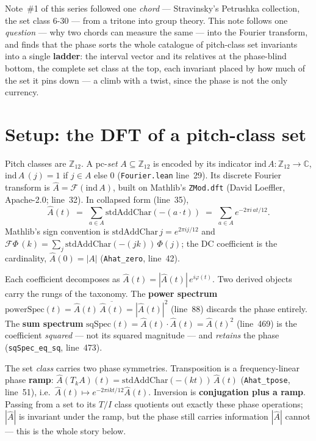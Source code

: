 \documentclass[11pt]{article}
\newcommand{\lean}[1]{\texttt{#1}}
\newcommand{\Ztwelve}{\mathbb{Z}_{12}}
\newcommand{\Ahat}{\hat{A}}
\begin{document}
Note~\#1 of this series followed one \emph{chord} --- Stravinsky's Petrushka collection, the set class
6-30 --- from a tritone into group theory. This note follows one \emph{question} --- why two chords can
measure the same --- into the Fourier transform, and finds that the phase sorts the whole catalogue of
pitch-class set invariants into a single \textbf{ladder}: the interval vector and its relatives at the
phase-blind bottom, the complete set class at the top, each invariant placed by how much of the set it pins
down --- a climb with a twist, since the phase is not the only currency.

\section{Setup: the DFT of a pitch-class set}\label{sec:setup}

Pitch classes are $\Ztwelve$. A pc-\emph{set} $A\subseteq\Ztwelve$ is encoded by its indicator
$\mathrm{ind}\,A:\Ztwelve\to\mathbb{C}$, $\mathrm{ind}\,A\,(j)=1$ if $j\in A$ else $0$ (\lean{Fourier.lean}
line~29). Its discrete Fourier transform is $\Ahat=\mathcal{F}(\mathrm{ind}\,A)$, built on Mathlib's
\lean{ZMod.dft} (David Loeffler, Apache-2.0; line~32). In collapsed form (line~35),
\[
  \Ahat(t)\;=\;\sum_{a\in A}\mathrm{stdAddChar}(-(a\cdot t))\;=\;\sum_{a\in A}e^{-2\pi i\,a t/12}.
\]
Mathlib's sign convention is $\mathrm{stdAddChar}\,j=e^{2\pi i j/12}$ and
$\mathcal{F}\Phi\,(k)=\sum_j\mathrm{stdAddChar}(-(jk))\,\Phi(j)$; the DC coefficient is the cardinality,
$\Ahat(0)=|A|$ (\lean{Ahat\_zero}, line~42).

Each coefficient decomposes as $\Ahat(t)=|\Ahat(t)|\,e^{i\varphi(t)}$. Two derived objects carry the
rungs of the taxonomy. The \textbf{power spectrum} $\mathrm{powerSpec}(t)=\Ahat(t)\,\overline{\Ahat(t)}
=|\Ahat(t)|^2$ (line~88) discards the phase entirely. The \textbf{sum spectrum}
$\mathrm{sqSpec}(t)=\Ahat(t)\cdot\Ahat(t)=\Ahat(t)^2$ (line~469) is the coefficient \emph{squared} --- not
its squared magnitude --- and \emph{retains} the phase (\lean{sqSpec\_eq\_sq}, line~473).

The set \emph{class} carries two phase symmetries. Transposition is a frequency-linear phase
\textbf{ramp}: $\Ahat(T_kA)(t)=\mathrm{stdAddChar}(-(kt))\,\Ahat(t)$ (\lean{Ahat\_tpose}, line~51), i.e.\
$\Ahat(t)\mapsto e^{-2\pi i k t/12}\Ahat(t)$. Inversion is \textbf{conjugation plus a ramp}. Passing from
a set to its $T/I$ class quotients out exactly these phase operations; $|\Ahat|$ is invariant under the
ramp, but the phase still carries information $|\Ahat|$ cannot --- this is the whole story below.
\end{document}
